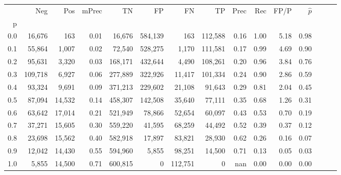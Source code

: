 \begin{tabular}{rrrrrrrrrrrrrrr}
\toprule
{} &      Neg &     Pos & mPrec &       TN &       FP &       FN &       TP &  Prec &   Rec &  FP/P & $\hat{p}$ \\
p   &          &         &       &          &          &          &          &       &       &       &           \\
\midrule
0.0 &   16,676 &     163 &  0.01 &   16,676 &  584,139 &      163 &  112,588 &  0.16 &  1.00 &  5.18 &      0.98 \\
0.1 &   55,864 &   1,007 &  0.02 &   72,540 &  528,275 &    1,170 &  111,581 &  0.17 &  0.99 &  4.69 &      0.90 \\
0.2 &   95,631 &   3,320 &  0.03 &  168,171 &  432,644 &    4,490 &  108,261 &  0.20 &  0.96 &  3.84 &      0.76 \\
0.3 &  109,718 &   6,927 &  0.06 &  277,889 &  322,926 &   11,417 &  101,334 &  0.24 &  0.90 &  2.86 &      0.59 \\
0.4 &   93,324 &   9,691 &  0.09 &  371,213 &  229,602 &   21,108 &   91,643 &  0.29 &  0.81 &  2.04 &      0.45 \\
0.5 &   87,094 &  14,532 &  0.14 &  458,307 &  142,508 &   35,640 &   77,111 &  0.35 &  0.68 &  1.26 &      0.31 \\
0.6 &   63,642 &  17,014 &  0.21 &  521,949 &   78,866 &   52,654 &   60,097 &  0.43 &  0.53 &  0.70 &      0.19 \\
0.7 &   37,271 &  15,605 &  0.30 &  559,220 &   41,595 &   68,259 &   44,492 &  0.52 &  0.39 &  0.37 &      0.12 \\
0.8 &   23,698 &  15,562 &  0.40 &  582,918 &   17,897 &   83,821 &   28,930 &  0.62 &  0.26 &  0.16 &      0.07 \\
0.9 &   12,042 &  14,430 &  0.55 &  594,960 &    5,855 &   98,251 &   14,500 &  0.71 &  0.13 &  0.05 &      0.03 \\
1.0 &    5,855 &  14,500 &  0.71 &  600,815 &        0 &  112,751 &        0 &   nan &  0.00 &  0.00 &      0.00 \\
\bottomrule
\end{tabular}
